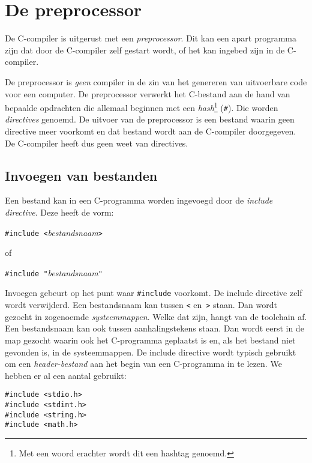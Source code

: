 \chapter{De preprocessor}
\label{cha:preprocessor}
\thispagestyle{empty}

De C-compiler is uitgerust met een \textsl{preprocessor}. Dit kan een apart programma zijn dat door de C-compiler zelf gestart wordt, of het kan ingebed zijn in de C-compiler.

De preprocessor is \textsl{geen} compiler in de zin van het genereren van uitvoerbare code voor een computer. De preprocessor verwerkt het C-bestand aan de hand van bepaalde opdrachten die allemaal beginnen met een \textsl{hash}\footnote{Met een woord erachter wordt dit een hashtag genoemd.} (\texttt{\#}). Die worden \textsl{directives} genoemd. De uitvoer van de preprocessor is een bestand waarin geen directive meer voorkomt en dat bestand wordt aan de C-compiler doorgegeven. De C-compiler heeft dus geen weet van directives.

\section{Invoegen van bestanden}
Een bestand kan in een C-programma worden ingevoegd door de \textsl{include directive}. Deze heeft de vorm:

\hspace*{1em}\texttt{\#include <}\textsl{bestandsnaam}\texttt{>}

of

\hspace*{1em}\texttt{\#include "{}}\textsl{bestandsnaam}\texttt{"}

Invoegen gebeurt op het punt waar \texttt{\#include} voorkomt. De include directive zelf wordt verwijderd. Een bestandsnaam kan tussen \texttt{<} en~\texttt{>} staan. Dan wordt gezocht in zogenoemde \textsl{systeemmappen}. Welke dat zijn, hangt van de toolchain af. Een bestandsnaam kan ook tussen aanhalingstekens staan. Dan wordt eerst in de map gezocht waarin ook het C-programma geplaatst is en, als het bestand niet gevonden is, in de systeemmappen. De include directive wordt typisch gebruikt om een \textsl{header-bestand} aan het begin van een C-programma in te lezen. We hebben er al een aantal gebruikt:

\hspace*{1em}\texttt{\#include <stdio.h>}\\
\hspace*{1em}\texttt{\#include <stdint.h>}\\
\hspace*{1em}\texttt{\#include <string.h>}\\
\hspace*{1em}\texttt{\#include <math.h>}

